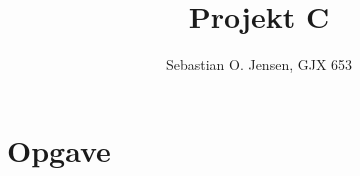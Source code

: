 \documentclass[12pt]{article}
\title{Projekt C}
\author{Sebastian O. Jensen, GJX 653}
\begin{document}
\newcommand{\A}{
\left(\begin{array}{cc}
6&1\\
4&4\\
2&2\\
13&-2
\end{array}\right)
  }

\newcommand{\AT}{
\left(\begin{array}{cccc}
6&4&2&13\\
1&4&2&-2
\end{array}\right)
  }
 
\maketitle
\newpage
\section{Opgave}
\end{document}
